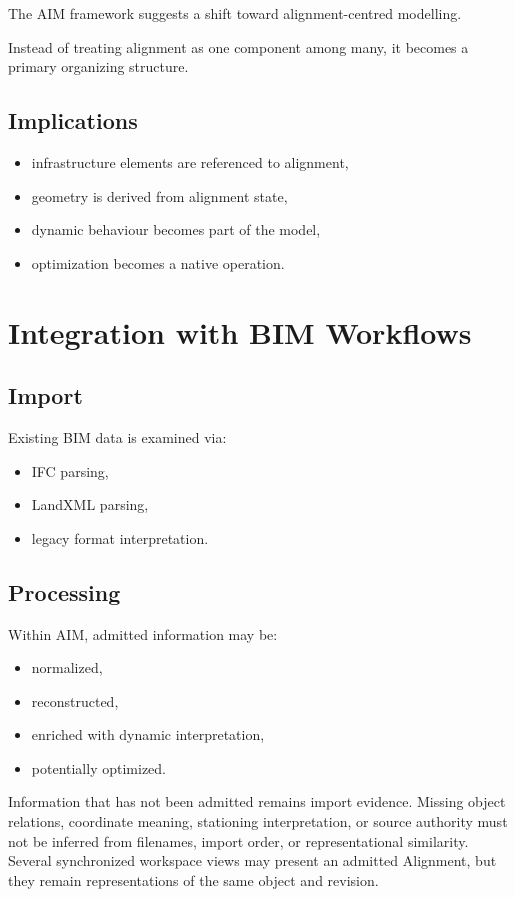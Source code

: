 The AIM framework suggests a shift toward alignment-centred modelling.

Instead of treating alignment as one component among many, it becomes a
primary organizing structure.


\subsection{Implications}

\begin{itemize}
\item infrastructure elements are referenced to alignment,
\item geometry is derived from alignment state,
\item dynamic behaviour becomes part of the model,
\item optimization becomes a native operation.
\end{itemize}


\section{Integration with BIM Workflows}

\subsection{Import}

Existing BIM data is examined via:
\begin{itemize}
\item IFC parsing,
\item LandXML parsing,
\item legacy format interpretation.
\end{itemize}


\subsection{Processing}

Within AIM, admitted information may be:
\begin{itemize}
\item normalized,
\item reconstructed,
\item enriched with dynamic interpretation,
\item potentially optimized.
\end{itemize}

Information that has not been admitted remains import evidence. Missing object
relations, coordinate meaning, stationing interpretation, or source authority
must not be inferred from filenames, import order, or representational
similarity. Several synchronized workspace views may present an admitted
Alignment, but they remain representations of the same object and revision.


